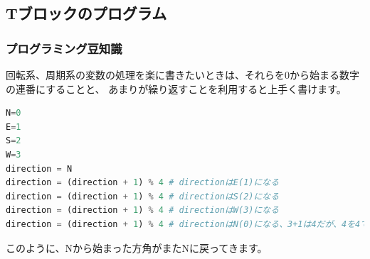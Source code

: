 \newpage
\subsection{Tブロックのプログラム}



\newpage
\subsubsection{プログラミング豆知識}
回転系、周期系の変数の処理を楽に書きたいときは、それらを0から始まる数字の連番にすることと、
あまりが繰り返すことを利用すると上手く書けます。
\begin{lstlisting}[caption=方角を扱う,language=Python]
N=0
E=1
S=2
W=3
direction = N
direction = (direction + 1) % 4 # directionはE(1)になる
direction = (direction + 1) % 4 # directionはS(2)になる
direction = (direction + 1) % 4 # directionはW(3)になる
direction = (direction + 1) % 4 # directionはN(0)になる、3+1は4だが、4を4で割った余りは0なため
\end{lstlisting}
このように、Nから始まった方角がまたNに戻ってきます。


